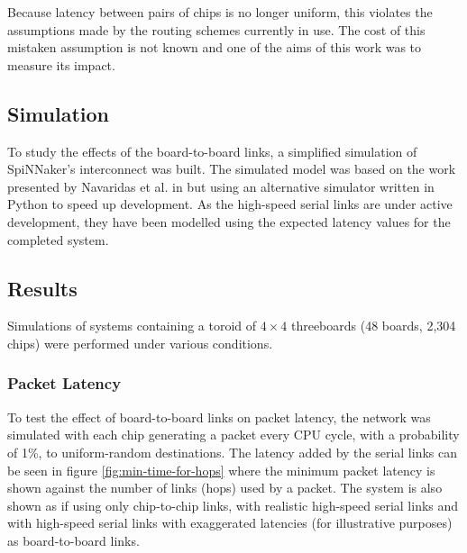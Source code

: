 		Because latency between pairs of chips is no longer uniform, this violates
		the assumptions made by the routing schemes currently in use. The cost of
		this mistaken assumption is not known and one of the aims of this work was
		to measure its impact.
		
		\subsection{Simulation}
			
			To study the effects of the board-to-board links, a simplified simulation
			of SpiNNaker's interconnect was built. The simulated model was based on
			the work presented by Navaridas et al. in \cite{navaridas09} but using an
			alternative simulator written in Python to speed up development. As the
			high-speed serial links are under active development, they have been
			modelled using the expected latency values for the completed system.
			
		\subsection{Results}
			
			Simulations of systems containing a toroid of $4\times4$ threeboards (48
			boards, 2,304 chips) were performed under various conditions.
			
			\subsubsection{Packet Latency}
			
				To test the effect of board-to-board links on packet latency, the
				network was simulated with each chip generating a packet every CPU
				cycle, with a probability of 1\%, to uniform-random destinations. The
				latency added by the serial links can be seen in figure
				\ref{fig:min-time-for-hops} where the minimum packet latency is shown
				against the number of links (hops) used by a packet. The system is also
				shown as if using only chip-to-chip links, with realistic high-speed
				serial links and with high-speed serial links with exaggerated latencies
				(for illustrative purposes) as board-to-board links.
				
